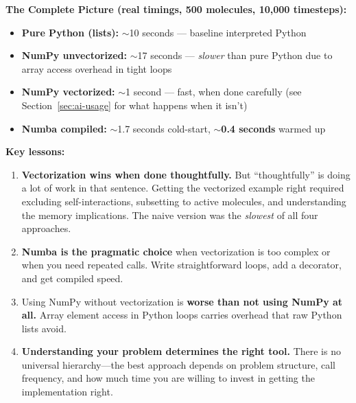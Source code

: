 \begin{note}
\textbf{The Complete Picture (real timings, 500 molecules, 10,000 timesteps):}
\begin{itemize}
    \item \textbf{Pure Python (lists):} $\sim$10 seconds --- baseline interpreted Python
    \item \textbf{NumPy unvectorized:} $\sim$17 seconds --- \emph{slower} than pure Python due to array access overhead in tight loops
    \item \textbf{NumPy vectorized:} $\sim$1 second --- fast, when done carefully (see Section~\ref{sec:ai-usage} for what happens when it isn't)
    \item \textbf{Numba compiled:} $\sim$1.7 seconds cold-start, $\sim$\textbf{0.4 seconds} warmed up
\end{itemize}

\textbf{Key lessons:}
\begin{enumerate}
    \item \textbf{Vectorization wins when done thoughtfully.} But ``thoughtfully'' is doing a lot of work in that sentence. Getting the vectorized example right required excluding self-interactions, subsetting to active molecules, and understanding the memory implications. The naive version was the \emph{slowest} of all four approaches.
    \item \textbf{Numba is the pragmatic choice} when vectorization is too complex or when you need repeated calls. Write straightforward loops, add a decorator, and get compiled speed.
    \item Using NumPy without vectorization is \textbf{worse than not using NumPy at all.} Array element access in Python loops carries overhead that raw Python lists avoid.
    \item \textbf{Understanding your problem determines the right tool.} There is no universal hierarchy---the best approach depends on problem structure, call frequency, and how much time you are willing to invest in getting the implementation right.
\end{enumerate}
\end{note}

